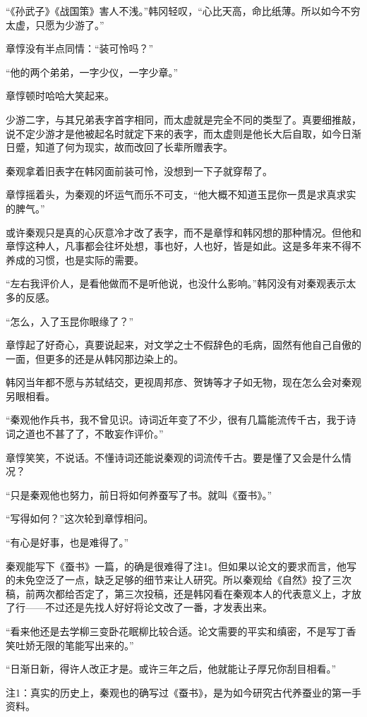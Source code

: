 “《孙武子》《战国策》害人不浅。”韩冈轻叹，“心比天高，命比纸薄。所以如今不穷太虚，只愿为少游了。”

章惇没有半点同情：“装可怜吗？”

“他的两个弟弟，一字少仪，一字少章。”

章惇顿时哈哈大笑起来。

少游二字，与其兄弟表字首字相同，而太虚就是完全不同的类型了。真要细推敲，说不定少游才是他被起名时就定下来的表字，而太虚则是他长大后自取，如今日渐日蹙，知道了何为现实，故而改回了长辈所赠表字。

秦观拿着旧表字在韩冈面前装可怜，没想到一下子就穿帮了。

章惇摇着头，为秦观的坏运气而乐不可支，“他大概不知道玉昆你一贯是求真求实的脾气。”

或许秦观只是真的心灰意冷才改了表字，而不是章惇和韩冈想的那种情况。但他和章惇这种人，凡事都会往坏处想，事也好，人也好，皆是如此。这是多年来不得不养成的习惯，也是实际的需要。

“左右我评价人，是看他做而不是听他说，也没什么影响。”韩冈没有对秦观表示太多的反感。

“怎么，入了玉昆你眼缘了？”

章惇起了好奇心，真要说起来，对文学之士不假辞色的毛病，固然有他自己自傲的一面，但更多的还是从韩冈那边染上的。

韩冈当年都不愿与苏轼结交，更视周邦彦、贺铸等才子如无物，现在怎么会对秦观另眼相看。

“秦观他作兵书，我不曾见识。诗词近年变了不少，很有几篇能流传千古，我于诗词之道也不甚了了，不敢妄作评价。”

章惇笑笑，不说话。不懂诗词还能说秦观的词流传千古。要是懂了又会是什么情况？

“只是秦观他也努力，前日将如何养蚕写了书。就叫《蚕书》。”

“写得如何？”这次轮到章惇相问。

“有心是好事，也是难得了。”

秦观能写下《蚕书》一篇，的确是很难得了注1。但如果以论文的要求而言，他写的未免空泛了一点，缺乏足够的细节来让人研究。所以秦观给《自然》投了三次稿，前两次都给否定了，第三次投稿，还是韩冈看在秦观本人的代表意义上，才放了行——不过还是先找人好好将论文改了一番，才发表出来。

“看来他还是去学柳三变卧花眠柳比较合适。论文需要的平实和缜密，不是写丁香笑吐娇无限的笔能写出来的。”

“日渐日新，得许人改正才是。或许三年之后，他就能让子厚兄你刮目相看。”

注1：真实的历史上，秦观也的确写过《蚕书》，是为如今研究古代养蚕业的第一手资料。
